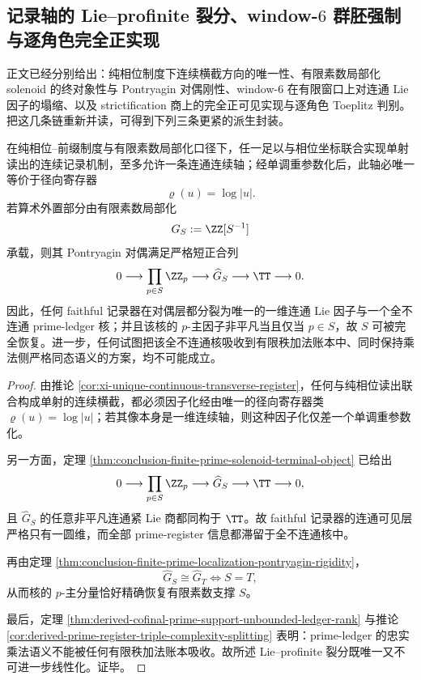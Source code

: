 \subsection{记录轴的 Lie--profinite 裂分、window-\texorpdfstring{$6$}{6} 群胚强制与逐角色完全正实现}

正文已经分别给出：纯相位制度下连续横截方向的唯一性、有限素数局部化 solenoid 的终对象性与 Pontryagin 对偶刚性、window-\(6\) 在有限窗口上对连通 Lie 因子的塌缩、以及 strictification 商上的完全正可见实现与逐角色 Toeplitz 判别。
把这几条链重新并读，可得到下列三条更紧的派生封装。

\begin{theorem}\label{thm:derived-record-axis-lie-profinite-unique-splitting}
在纯相位--前缀制度与有限素数局部化口径下，任一足以与相位坐标联合实现单射读出的连续记录机制，至多允许一条连通连续轴；经单调重参数化后，此轴必唯一等价于径向寄存器
\[
\varrho(u)=\log|u|.
\]
若算术外置部分由有限素数局部化
\[
G_S:=\ZZ[S^{-1}]
\]
承载，则其 Pontryagin 对偶满足严格短正合列
\[
0\longrightarrow \prod_{p\in S}\ZZ_p
\longrightarrow \widehat G_S
\longrightarrow \TT
\longrightarrow 0.
\]
因此，任何 faithful 记录器在对偶层都分裂为唯一的一维连通 Lie 因子与一个全不连通 prime-ledger 核；并且该核的 \(p\)-主因子非平凡当且仅当 \(p\in S\)，故 \(S\) 可被完全恢复。进一步，任何试图把该全不连通核吸收到有限秩加法账本中、同时保持乘法侧严格同态语义的方案，均不可能成立。
\end{theorem}

\begin{proof}
由推论 \ref{cor:xi-unique-continuous-transverse-register}，任何与纯相位读出联合构成单射的连续横截，都必须因子化经由唯一的径向寄存器类 \(\varrho(u)=\log|u|\)；若其像本身是一维连续轴，则这种因子化仅差一个单调重参数化。

另一方面，定理 \ref{thm:conclusion-finite-prime-solenoid-terminal-object} 已给出
\[
0\longrightarrow \prod_{p\in S}\ZZ_p
\longrightarrow \widehat G_S
\longrightarrow \TT
\longrightarrow 0,
\]
且 \(\widehat G_S\) 的任意非平凡连通紧 Lie 商都同构于 \(\TT\)。故 faithful 记录器的连通可见层严格只有一圆维，而全部 prime-register 信息都滞留于全不连通核中。

再由定理 \ref{thm:conclusion-finite-prime-localization-pontryagin-rigidity}，
\[
\widehat G_S\cong \widehat G_T
\iff
S=T,
\]
从而核的 \(p\)-主分量恰好精确恢复有限素数支撑 \(S\)。

最后，定理 \ref{thm:derived-cofinal-prime-support-unbounded-ledger-rank} 与推论 \ref{cor:derived-prime-register-triple-complexity-splitting} 表明：prime-ledger 的忠实乘法语义不能被任何有限秩加法账本吸收。故所述 Lie--profinite 裂分既唯一又不可进一步线性化。证毕。
\end{proof}

